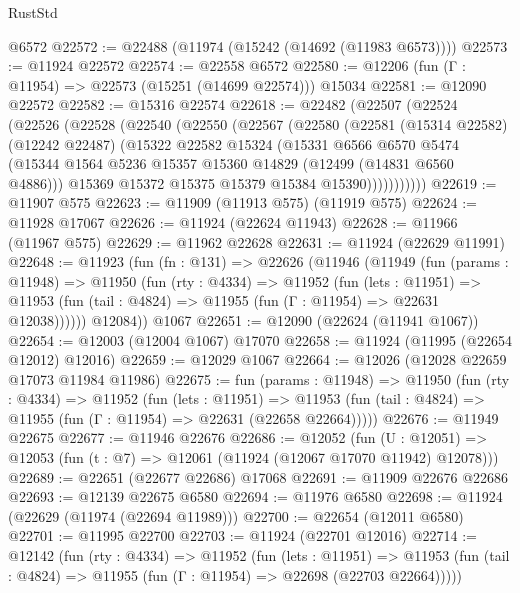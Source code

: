 \begin{lexlean}{RustStd}
\begin{coremodule}
{\begin{coremodule}
{{{{{{{{{{{{{{{{{{{{{{{{{{{{{{{{{{{{{{{{{{{{{{{{{{{{{{{{{{{{{{{{{{{{{{{{{{{{{{{{    @6572
@22572 := @22488 (@11974 (@15242 (@14692 (@11983 @6573))))
@22573 := @11924 @22572
@22574 := @22558 @6572
@22580 := @12206 (fun (Γ : @11954) => @22573 (@15251 (@14699 @22574))) @15034
@22581 := @12090 @22572
@22582 := @15316 @22574
@22618 := @22482
    (@22507
      (@22524
        (@22526
          (@22528
            (@22540
              (@22550
                (@22567
                  (@22580
                    (@22581
                      (@15314 @22582)
                      (@12242 @22487)
                      (@15322
                        @22582
                        @15324
                        (@15331
                          @6566
                          @6570
                          @5474
                          (@15344 @1564 @5236 @15357 @15360 @14829 (@12499 (@14831 @6560 @4886)))
                          @15369
                          @15372
                          @15375
                          @15379
                          @15384
                          @15390)))))))))))
@22619 := @11907 @575
@22623 := @11909 (@11913 @575) (@11919 @575)
@22624 := @11928 @17067
@22626 := @11924 (@22624 @11943)
@22628 := @11966 (@11967 @575)
@22629 := @11962 @22628
@22631 := @11924 (@22629 @11991)
@22648 := @11923
    (fun (fn : @131) =>
    @22626
      (@11946
        (@11949
          (fun (params : @11948) =>
          @11950
            (fun (rty : @4334) =>
            @11952
              (fun (lets : @11951) =>
              @11953 (fun (tail : @4824) => @11955 (fun (Γ : @11954) => @22631 @12038))))))
        @12084))
    @1067
@22651 := @12090 (@22624 (@11941 @1067))
@22654 := @12003 (@12004 @1067) @17070
@22658 := @11924 (@11995 (@22654 @12012) @12016)
@22659 := @12029 @1067
@22664 := @12026 (@12028 @22659 @17073 @11984 @11986)
@22675 := fun (params : @11948) =>
  @11950
    (fun (rty : @4334) =>
    @11952
      (fun (lets : @11951) =>
      @11953 (fun (tail : @4824) => @11955 (fun (Γ : @11954) => @22631 (@22658 @22664)))))
@22676 := @11949 @22675
@22677 := @11946 @22676
@22686 := @12052
    (fun (U : @12051) => @12053 (fun (t : @7) => @12061 (@11924 (@12067 @17070 @11942) @12078)))
@22689 := @22651 (@22677 @22686) @17068
@22691 := @11909 @22676 @22686
@22693 := @12139 @22675 @6580
@22694 := @11976 @6580
@22698 := @11924 (@22629 (@11974 (@22694 @11989)))
@22700 := @22654 (@12011 @6580)
@22701 := @11995 @22700
@22703 := @11924 (@22701 @12016)
@22714 := @12142
    (fun (rty : @4334) =>
    @11952
      (fun (lets : @11951) =>
      @11953 (fun (tail : @4824) => @11955 (fun (Γ : @11954) => @22698 (@22703 @22664)))))
}}}}}}}}}}}}}}}}}}}}}}}}}}}}}}}}}}}}}}}}}}}}}}}}}}}}}}}}}}}}}}}}}}}}}}}}}}}}}}}}
\end{coremodule}}
\end{coremodule}
\end{lexlean}
